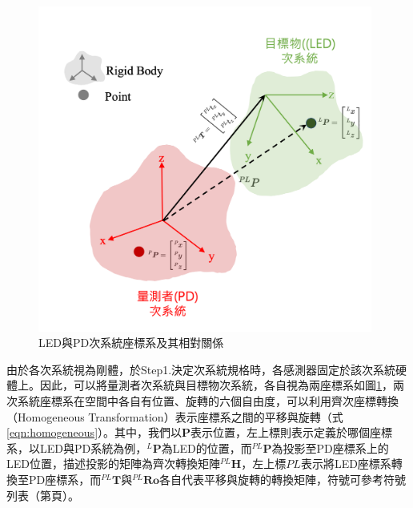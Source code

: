     \begin{figure}[htpb]
        \centering
        \includegraphics[width=11cm]{ch2pic/homo_trans.png}
        \caption{LED與PD次系統座標系及其相對關係}
        \label{pic:homo_trans}
    \end{figure}

    由於各次系統視為剛體，於Step1.決定次系統規格時，各感測器固定於該次系統硬體上。因此，可以將量測者次系統與目標物次系統，各自視為兩座標系如圖\ref{pic:homo_trans}，兩次系統座標系在空間中各自有位置、旋轉的六個自由度，可以利用齊次座標轉換（Homogeneous Transformation）表示座標系之間的平移與旋轉（式\ref{eqn:homogeneous}）。其中，我們以$\boldsymbol{P}$表示位置，左上標則表示定義於哪個座標系，以LED與PD系統為例，$^{L}\boldsymbol{P}$為LED的位置，而$^{PL}\boldsymbol{P}$為投影至PD座標系上的LED位置，描述投影的矩陣為齊次轉換矩陣$^{PL}\boldsymbol{H}$，左上標$PL$表示將LED座標系轉換至PD座標系，而$^{PL}\boldsymbol{T}$與$^{PL}\boldsymbol{Ro}$各自代表平移與旋轉的轉換矩陣，符號可參考符號列表（第\pageref{chp:symbol}頁）。

    
    
    
    
  


